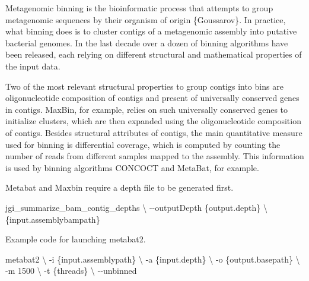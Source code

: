 \documentclass[
]{book}
\newenvironment{Shaded}{\begin{snugshade}}{\end{snugshade}}
\newcommand{\AttributeTok}[1]{\textcolor[rgb]{0.13,0.29,0.53}{#1}}
\newcommand{\DataTypeTok}[1]{\textcolor[rgb]{0.13,0.29,0.53}{#1}}
\newcommand{\ExtensionTok}[1]{#1}
\newcommand{\NormalTok}[1]{#1}
\begin{document}
Metagenomic binning is the bioinformatic process that attempts to group metagenomic sequences by their organism of origin \{Goussarov\}. In practice, what binning does is to cluster contigs of a metagenomic assembly into putative bacterial genomes. In the last decade over a dozen of binning algorithms have been released, each relying on different structural and mathematical properties of the input data.

Two of the most relevant structural properties to group contigs into bins are oligonucleotide composition of contigs and present of universally conserved genes in contigs. MaxBin, for example, relies on such universally conserved genes to initialize clusters, which are then expanded using the oligonucleotide composition of contigs. Besides structural attributes of contigs, the main quantitative measure used for binning is differential coverage, which is computed by counting the number of reads from different samples mapped to the assembly. This information is used by binning algorithms CONCOCT and MetaBat, for example.

Metabat and Maxbin require a depth file to be generated first.
\small

\begin{Shaded}
\begin{Highlighting}[]
\ExtensionTok{jgi\_summarize\_bam\_contig\_depths} \DataTypeTok{\textbackslash{}}
    \AttributeTok{{-}{-}outputDepth}\NormalTok{ \{output.depth\} }\DataTypeTok{\textbackslash{}}
\NormalTok{    \{input.assemblybampath\}}
\end{Highlighting}
\end{Shaded}

\normalsize

Example code for launching metabat2.
\small

\begin{Shaded}
\begin{Highlighting}[]
\ExtensionTok{metabat2} \DataTypeTok{\textbackslash{}}
    \AttributeTok{{-}i}\NormalTok{ \{input.assemblypath\} }\DataTypeTok{\textbackslash{}}
    \AttributeTok{{-}a}\NormalTok{ \{input.depth\} }\DataTypeTok{\textbackslash{}}
    \AttributeTok{{-}o}\NormalTok{ \{output.basepath\} }\DataTypeTok{\textbackslash{}}
    \AttributeTok{{-}m}\NormalTok{ 1500 }\DataTypeTok{\textbackslash{}}
    \AttributeTok{{-}t}\NormalTok{ \{threads\} }\DataTypeTok{\textbackslash{}}
    \AttributeTok{{-}{-}unbinned}
\end{Highlighting}
\end{Shaded}
\end{document}
